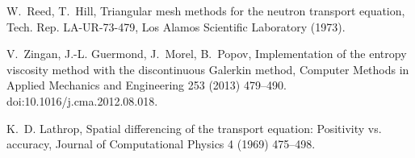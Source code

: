 \documentclass[xchauthor,chkrefs,fixeqskip,GCNS,amsmath,amsthm]{yjcphg}
\theoremstyle{remark}
\begin{document}
\begin{backmatter}
\begin{thebibliography}{}
\begin{bsubitem}
\begin{bcontribution}%
\end{bcontribution}
\prnsep{,\ }
\begin{bhost}
\begin{bbook}[class=report]
\end{bbook}
\end{bhost}
\end{bsubitem}
%
\OrigBibText
W.~Reed, T.~Hill, Triangular mesh methods for the neutron transport
equation, Tech. Rep. LA-UR-73-479, Los Alamos Scientific Laboratory
(1973).
\endOrigBibText
{}%
\endbibitem

\begin{bsubitem}
\begin{bcontribution}%
\end{bcontribution}
\begin{bhost}
\begin{bissue}
\end{bissue}
\end{bhost}
\end{bsubitem}
%
\OrigBibText
V.~{Zingan}, J.-L. Guermond, J.~{Morel}, B.~{Popov}, {Implementation
of the entropy viscosity method with the discontinuous Galerkin method},
Computer Methods in Applied Mechanics and Engineering 253 (2013)
479--490.
\newblock doi:10.1016/j.cma.2012.08.018.
\endOrigBibText
{}%
\endbibitem

\begin{bsubitem}
\begin{bcontribution}%
\end{bcontribution}
\begin{bhost}
\begin{bissue}
\end{bissue}
\end{bhost}
\end{bsubitem}
%
\OrigBibText
K.~D. Lathrop, Spatial differencing of the transport equation:
Positivity vs. accuracy, Journal of Computational Physics 4 (1969)
475--498.
\endOrigBibText
{}%
\endbibitem


\end{thebibliography}
\end{backmatter}
\end{document}
